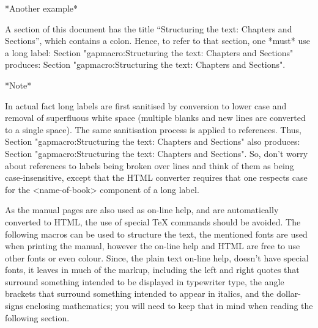 *Another example*

A section of this document has the title
``Structuring the text: Chapters and Sections'',
which contains a colon. Hence, to refer to that section, one *must* use a
long label: 
\begintt
Section "gapmacro:Structuring the text: Chapters and Sections"
\endtt
produces: Section "gapmacro:Structuring the text: Chapters and Sections".

*Note*

In actual fact long labels are first sanitised by conversion to lower case
and removal of superfluous white space (multiple blanks and new lines are
converted to a single space). The same sanitisation process is applied to
references. Thus, 
\begintt
Section "gapmacro:Structuring the text:                          Chapters
and Sections"
\endtt
also produces: 
Section "gapmacro:Structuring the text:                          Chapters
and Sections".
So, don't worry about references to labels being broken over  lines
and think of  them  as  being  case-insensitive,  except  that  the  HTML
converter  requires  that  one  respects  case  for  the   <name-of-book>
component of a long label.


\indextt{\\lq}\indextt{\\pif}\indextt{\\rq}
\indextt{\\>}\indextt{\\index}\indextt{\\indextt}
\indextt{\\atindex}
\indextt{\\fmark}
\indextt{\\URL}\indextt{\\Mailto}
\indextt{\\Package}\indextt{\\package}
As the manual pages are also used as on-line help, and are  automatically
converted to HTML, the use of special {\TeX} commands should be  avoided.
The following macros can be used to structure  the  text,  the  mentioned
fonts are used when printing the manual, however  the  on-line  help  and
HTML are free to use other fonts or even colour. Since,  the  plain  text
on-line help, doesn't have special  fonts,  it  leaves  in  much  of  the
markup, including the left  and  right  quotes  that  surround  something
intended to be displayed in typewriter  type,  the  angle  brackets  that
surround something intended to appear in italics,  and  the  dollar-signs
enclosing mathematics; you will need to keep that in  mind  when  reading
the following section.

